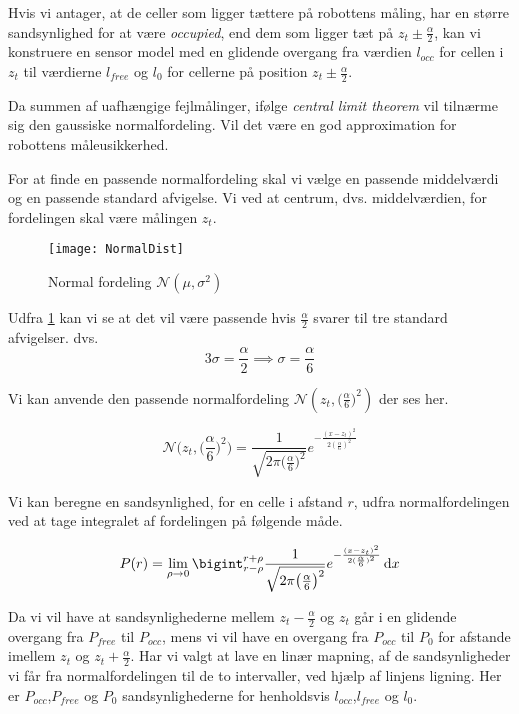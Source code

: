 Hvis vi antager, at de celler som ligger tættere på robottens måling, har en større sandsynlighed for at være \emph{occupied}, end dem som ligger tæt på $z_t \pm \frac{\alpha}{2}$, kan vi konstruere en sensor model med en glidende overgang fra værdien $l_{occ}$ for cellen i $z_t$ til værdierne $l_{free}$ og $l_0$ for cellerne på position $z_t \pm \frac{\alpha}{2}$. 

Da summen af uafhængige fejlmålinger, ifølge \emph{central limit theorem} vil tilnærme sig
den gaussiske normalfordeling. \cite[p. 223]{ArtificialIntelligence}
Vil det være en god approximation for robottens måleusikkerhed.

For at finde en passende normalfordeling skal vi vælge en passende middelværdi og en passende standard afvigelse. 
Vi ved at centrum, dvs. middelværdien, for fordelingen skal være målingen $z_t$.

\begin{figure}
\centering \texttt{[image: NormalDist]}
\label{normaldistimg}
\caption{Normal fordeling $\mathcal{N}(\mu,\sigma^2)$}
\end{figure}

Udfra \cref{normaldistimg} kan vi se at det vil være passende hvis $\frac{\alpha}{2}$ svarer til tre standard afvigelser. dvs.
\begin{equation}
	3\sigma = \frac{\alpha}{2} \implies \sigma = \frac{\alpha}{6}
\end{equation}

Vi kan anvende den passende normalfordeling $\mathcal{N}(z_t,\big(\frac{\alpha}{6}\big)^2)$ der ses her. 

\begin{equation}
\mathcal{N}\bigg(z_t,\bigg(\frac{\alpha}{6}\bigg)^2\bigg) = 
\frac{1}{\sqrt{2 \pi \big(\frac{\alpha}{6}\big)^2}}e^{- \frac{(x - z_t)^2}{2 (\frac{\alpha}{6})^2}}
\end{equation}

Vi kan beregne en sandsynlighed, for en celle i afstand $r$, udfra normalfordelingen ved at tage integralet af fordelingen på følgende måde.

\begin{equation}
P(r) = \lim \limits_{\rho \to 0} \bigint_{r-\rho}^{r+\rho} \frac{1}{\sqrt{2 \pi \big(\frac{\alpha}{6}\big)^2}}e^{- \frac{(x - z_t)^2}{2 (\frac{\alpha}{6})^2}}\, \mathrm{d}x
\end{equation}


Da vi vil have at sandsynlighederne mellem $z_t-\frac{\alpha}{2}$ og $z_t$ går i en glidende overgang fra $P_{free}$ til $P_{occ}$,
mens vi vil have en overgang fra $P_{occ}$ til ${P_0}$ for afstande imellem $z_t$ og $z_t+\frac{\alpha}{2}$.
Har vi valgt at lave en linær mapning, af de sandsynligheder vi får fra normalfordelingen til de to intervaller, ved hjælp af linjens ligning.
Her er $P_{occ}$,$P_{free}$ og $P_0$ sandsynlighederne for henholdsvis $l_{occ}$,$l_{free}$ og $l_0$.



